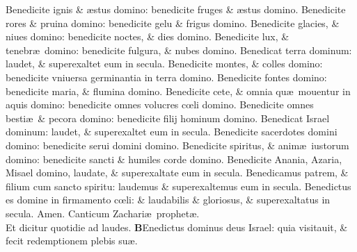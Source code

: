 \documentclass[a5paper,10pt]{book}
\def\ae{æ}
\def\oe{œ}
\begin{document}
\begin{multicols*}{2}
\newline \color{red} B\color{black}enedicite ignis \& \ae stus domino: benedicite fruges \& \ae stus domino.
\newline \color{red} B\color{black}enedicite rores \& pruina domino: benedicite gelu \& frigus domino.
\newline \color{red} B\color{black}enedicite glacies, \& niues domino: benedicite noctes, \& dies domino.
\newline \color{red} B\color{black}enedicite lux, \& tenebr\ae \ domino: benedicite fulgura, \& nubes domino.
\newline \color{red} B\color{black}enedicat terra dominum: laudet, \& superexaltet eum in secula.
\newline \color{red} B\color{black}enedicite montes, \& colles domino: benedicite vniuersa germinantia in terra domino.
\newline \color{red} B\color{black}enedicite fontes domino: benedicite maria, \& flumina domino.
\newline \color{red} B\color{black}enedicite cete, \& omnia qu\ae \ mouentur in aquis domino: benedicite omnes volucres c\oe li domino.
\newline \color{red} B\color{black}enedicite omnes besti\ae \ \& pecora domino: benedicite filij hominum domino.
\newline \color{red} B\color{black}enedicat Israel dominum: laudet, \& superexaltet eum in secula.
\newline \color{red} B\color{black}enedicite sacerdotes domini domino: benedicite serui domini domino.
\newline \color{red} B\color{black}enedicite spiritus, \& anim\ae \ iustorum domino: benedicite sancti \& humiles corde domino.
\newline \color{red} B\color{black}enedicite Anania, Azaria, Misael domino, laudate, \& superexaltate eum in secula.
\newline \color{red} B\color{black}enedicamus patrem, \& filium cum sancto spiritu: laudemus \& superexaltemus eum in secula.
\newline \color{red} B\color{black}enedictus es domine in firmamento c\oe li: \& laudabilis \& gloriosus, \& superexaltatus in secula. Amen.
\newline {} \color{red} \hypertarget{Benedictus}{Canticum} Zachari\ae \ prophet\ae .\\Et dicitur quotidie ad laudes. \color{black}
\vspace{-1em}
\lettrine[lines=2]{\bfseries \color{red} B}{}Enedictus dominus deus Israel: quia visitauit, \& fecit redemptionem plebis su\ae .

\end{multicols*}
\end{document}
